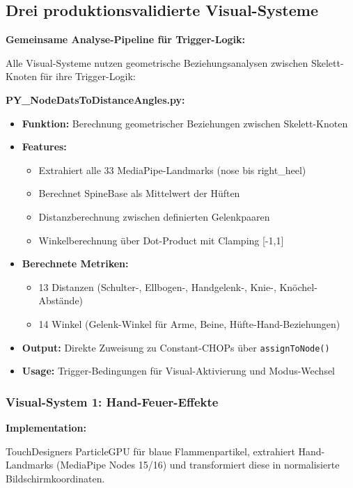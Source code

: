 \newpage

\subsection{Drei produktionsvalidierte Visual-Systeme}

\textbf{Gemeinsame Analyse-Pipeline für Trigger-Logik:}

\raggedright Alle Visual-Systeme nutzen geometrische Beziehungsanalysen zwischen Skelett-Knoten für ihre Trigger-Logik:

\textbf{PY\_NodeDatsToDistanceAngles.py:}
\begin{itemize}
    \item \textbf{Funktion:} Berechnung geometrischer Beziehungen zwischen Skelett-Knoten
    \item \textbf{Features:}
    \begin{itemize}
        \item Extrahiert alle 33 MediaPipe-Landmarks (nose bis right\_heel)
        \item Berechnet SpineBase als Mittelwert der Hüften
        \item Distanzberechnung zwischen definierten Gelenkpaaren
        \item Winkelberechnung über Dot-Product mit Clamping [-1,1]
    \end{itemize}
    \item \textbf{Berechnete Metriken:}
    \begin{itemize}
        \item 13 Distanzen (Schulter-, Ellbogen-, Handgelenk-, Knie-, Knöchel-Abstände)
        \item 14 Winkel (Gelenk-Winkel für Arme, Beine, Hüfte-Hand-Beziehungen)
    \end{itemize}
    \item \textbf{Output:} Direkte Zuweisung zu Constant-CHOPs über \texttt{assignToNode()}
    \item \textbf{Usage:} Trigger-Bedingungen für Visual-Aktivierung und Modus-Wechsel
\end{itemize}

\subsubsection{Visual-System 1: Hand-Feuer-Effekte}


\textbf{Implementation:} \raggedright TouchDesigners ParticleGPU für blaue Flammenpartikel, extrahiert Hand-Landmarks (MediaPipe Nodes 15/16) und transformiert diese in normalisierte Bildschirmkoordinaten.

